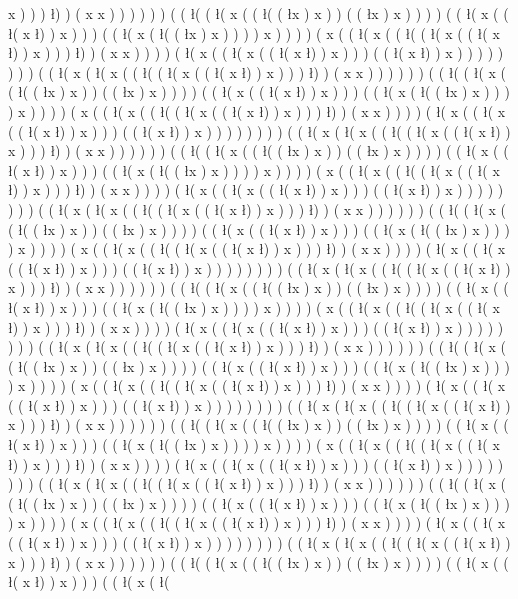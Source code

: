 x ) ) ) \l ) ) ( x x ) ) ) ) ) ) ( ( \l ( ( \l ( x ( ( \l ( ( \l x ) x ) ) ( ( \l x ) x ) ) ) ) ( ( \l ( x ( ( \l ( x \l ) ) x ) ) ) ( ( \l ( x ( \l ( ( \l x ) x ) ) ) ) x ) ) ) ) ( x ( ( \l ( x ( ( \l ( ( \l ( x ( ( \l ( x \l ) ) x ) ) ) \l ) ) ( x x ) ) ) ) ( \l ( x ( ( \l ( x ( ( \l ( x \l ) ) x ) ) ) ( ( \l ( x \l ) ) x ) ) ) ) ) ) ) ) ( ( \l ( x ( \l ( x ( ( \l ( ( \l ( x ( ( \l ( x \l ) ) x ) ) ) \l ) ) ( x x ) ) ) ) ) ) ( ( \l ( ( \l ( x ( ( \l ( ( \l x ) x ) ) ( ( \l x ) x ) ) ) ) ( ( \l ( x ( ( \l ( x \l ) ) x ) ) ) ( ( \l ( x ( \l ( ( \l x ) x ) ) ) ) x ) ) ) ) ( x ( ( \l ( x ( ( \l ( ( \l ( x ( ( \l ( x \l ) ) x ) ) ) \l ) ) ( x x ) ) ) ) ( \l ( x ( ( \l ( x ( ( \l ( x \l ) ) x ) ) ) ( ( \l ( x \l ) ) x ) ) ) ) ) ) ) ) ( ( \l ( x ( \l ( x ( ( \l ( ( \l ( x ( ( \l ( x \l ) ) x ) ) ) \l ) ) ( x x ) ) ) ) ) ) ( ( \l ( ( \l ( x ( ( \l ( ( \l x ) x ) ) ( ( \l x ) x ) ) ) ) ( ( \l ( x ( ( \l ( x \l ) ) x ) ) ) ( ( \l ( x ( \l ( ( \l x ) x ) ) ) ) x ) ) ) ) ( x ( ( \l ( x ( ( \l ( ( \l ( x ( ( \l ( x \l ) ) x ) ) ) \l ) ) ( x x ) ) ) ) ( \l ( x ( ( \l ( x ( ( \l ( x \l ) ) x ) ) ) ( ( \l ( x \l ) ) x ) ) ) ) ) ) ) ) ( ( \l ( x ( \l ( x ( ( \l ( ( \l ( x ( ( \l ( x \l ) ) x ) ) ) \l ) ) ( x x ) ) ) ) ) ) ( ( \l ( ( \l ( x ( ( \l ( ( \l x ) x ) ) ( ( \l x ) x ) ) ) ) ( ( \l ( x ( ( \l ( x \l ) ) x ) ) ) ( ( \l ( x ( \l ( ( \l x ) x ) ) ) ) x ) ) ) ) ( x ( ( \l ( x ( ( \l ( ( \l ( x ( ( \l ( x \l ) ) x ) ) ) \l ) ) ( x x ) ) ) ) ( \l ( x ( ( \l ( x ( ( \l ( x \l ) ) x ) ) ) ( ( \l ( x \l ) ) x ) ) ) ) ) ) ) ) ( ( \l ( x ( \l ( x ( ( \l ( ( \l ( x ( ( \l ( x \l ) ) x ) ) ) \l ) ) ( x x ) ) ) ) ) ) ( ( \l ( ( \l ( x ( ( \l ( ( \l x ) x ) ) ( ( \l x ) x ) ) ) ) ( ( \l ( x ( ( \l ( x \l ) ) x ) ) ) ( ( \l ( x ( \l ( ( \l x ) x ) ) ) ) x ) ) ) ) ( x ( ( \l ( x ( ( \l ( ( \l ( x ( ( \l ( x \l ) ) x ) ) ) \l ) ) ( x x ) ) ) ) ( \l ( x ( ( \l ( x ( ( \l ( x \l ) ) x ) ) ) ( ( \l ( x \l ) ) x ) ) ) ) ) ) ) ) ( ( \l ( x ( \l ( x ( ( \l ( ( \l ( x ( ( \l ( x \l ) ) x ) ) ) \l ) ) ( x x ) ) ) ) ) ) ( ( \l ( ( \l ( x ( ( \l ( ( \l x ) x ) ) ( ( \l x ) x ) ) ) ) ( ( \l ( x ( ( \l ( x \l ) ) x ) ) ) ( ( \l ( x ( \l ( ( \l x ) x ) ) ) ) x ) ) ) ) ( x ( ( \l ( x ( ( \l ( ( \l ( x ( ( \l ( x \l ) ) x ) ) ) \l ) ) ( x x ) ) ) ) ( \l ( x ( ( \l ( x ( ( \l ( x \l ) ) x ) ) ) ( ( \l ( x \l ) ) x ) ) ) ) ) ) ) ) ( ( \l ( x ( \l ( x ( ( \l ( ( \l ( x ( ( \l ( x \l ) ) x ) ) ) \l ) ) ( x x ) ) ) ) ) ) ( ( \l ( ( \l ( x ( ( \l ( ( \l x ) x ) ) ( ( \l x ) x ) ) ) ) ( ( \l ( x ( ( \l ( x \l ) ) x ) ) ) ( ( \l ( x ( \l ( ( \l x ) x ) ) ) ) x ) ) ) ) ( x ( ( \l ( x ( ( \l ( ( \l ( x ( ( \l ( x \l ) ) x ) ) ) \l ) ) ( x x ) ) ) ) ( \l ( x ( ( \l ( x ( ( \l ( x \l ) ) x ) ) ) ( ( \l ( x \l ) ) x ) ) ) ) ) ) ) ) ( ( \l ( x ( \l ( x ( ( \l ( ( \l ( x ( ( \l ( x \l ) ) x ) ) ) \l ) ) ( x x ) ) ) ) ) ) ( ( \l ( ( \l ( x ( ( \l ( ( \l x ) x ) ) ( ( \l x ) x ) ) ) ) ( ( \l ( x ( ( \l ( x \l ) ) x ) ) ) ( ( \l ( x ( \l ( ( \l x ) x ) ) ) ) x ) ) ) ) ( x ( ( \l ( x ( ( \l ( ( \l ( x ( ( \l ( x \l ) ) x ) ) ) \l ) ) ( x x ) ) ) ) ( \l ( x ( ( \l ( x ( ( \l ( x \l ) ) x ) ) ) ( ( \l ( x \l ) ) x ) ) ) ) ) ) ) ) ( ( \l ( x ( \l ( x ( ( \l ( ( \l ( x ( ( \l ( x \l ) ) x ) ) ) \l ) ) ( x x ) ) ) ) ) ) ( ( \l ( ( \l ( x ( ( \l ( ( \l x ) x ) ) ( ( \l x ) x ) ) ) ) ( ( \l ( x ( ( \l ( x \l ) ) x ) ) ) ( ( \l ( x ( \l ( 